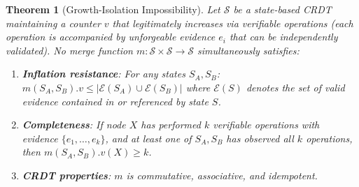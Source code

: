 \documentclass[11pt,a4paper]{article}
\newtheorem{theorem}{Theorem}
\begin{document}
\begin{theorem}[Growth-Isolation Impossibility]
\label{thm:crdt-impossibility}
Let $\mathcal{S}$ be a state-based CRDT maintaining a counter $v$ that legitimately increases via \emph{verifiable operations} (each operation is accompanied by unforgeable evidence $e_i$ that can be independently validated). No merge function $m: \mathcal{S} \times \mathcal{S} \to \mathcal{S}$ simultaneously satisfies:
\begin{enumerate}
    \item \textbf{Inflation resistance}: For any states $S_A, S_B$: $m(S_A, S_B).v \leq |\mathcal{E}(S_A) \cup \mathcal{E}(S_B)|$ where $\mathcal{E}(S)$ denotes the set of valid evidence contained in or referenced by state $S$.
    \item \textbf{Completeness}: If node $X$ has performed $k$ verifiable operations with evidence $\{e_1, \ldots, e_k\}$, and at least one of $S_A, S_B$ has observed all $k$ operations, then $m(S_A, S_B).v(X) \geq k$.
    \item \textbf{CRDT properties}: $m$ is commutative, associative, and idempotent.
\end{enumerate}
\end{theorem}
\end{document}
